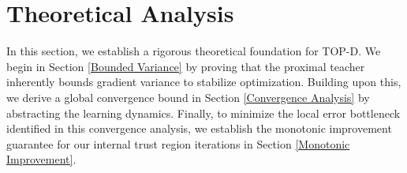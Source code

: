 \documentclass{article}
\theoremstyle{plain}
\theoremstyle{definition}
\theoremstyle{remark}
\begin{document}
\section{Theoretical Analysis}\label{Theoretical Analysis}
In this section, we establish a rigorous theoretical foundation for TOP-D. We begin in Section \ref{Bounded Variance} by proving that the proximal teacher inherently bounds gradient variance to stabilize optimization. Building upon this, we derive a global convergence bound in Section \ref{Convergence Analysis} by abstracting the learning dynamics. Finally, to minimize the local error bottleneck identified in this convergence analysis, we establish the monotonic improvement guarantee for our internal trust region iterations in Section \ref{Monotonic Improvement}.
\end{document}
